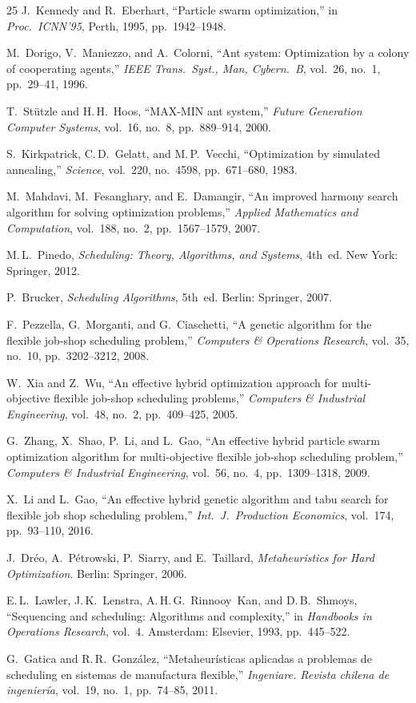 \documentclass[conference]{IEEEtran}
\begin{document}
\begin{thebibliography}{25}
J.~Kennedy and R.~Eberhart,
``Particle swarm optimization,''
in \textit{Proc.\ ICNN'95}, Perth, 1995, pp.~1942--1948.

M.~Dorigo, V.~Maniezzo, and A.~Colorni,
``Ant system: Optimization by a colony of cooperating agents,''
\textit{IEEE Trans.\ Syst., Man, Cybern.\ B}, vol.~26, no.~1,
pp.~29--41, 1996.

T.~St\"utzle and H.\,H.~Hoos,
``MAX-MIN ant system,''
\textit{Future Generation Computer Systems}, vol.~16, no.~8,
pp.~889--914, 2000.

S.~Kirkpatrick, C.\,D.~Gelatt, and M.\,P.~Vecchi,
``Optimization by simulated annealing,''
\textit{Science}, vol.~220, no.~4598, pp.~671--680, 1983.

M.~Mahdavi, M.~Fesanghary, and E.~Damangir,
``An improved harmony search algorithm for solving optimization
problems,''
\textit{Applied Mathematics and Computation}, vol.~188, no.~2,
pp.~1567--1579, 2007.

M.\,L.~Pinedo,
\textit{Scheduling: Theory, Algorithms, and Systems}, 4th~ed.
New York: Springer, 2012.

P.~Brucker,
\textit{Scheduling Algorithms}, 5th~ed.
Berlin: Springer, 2007.

F.~Pezzella, G.~Morganti, and G.~Ciaschetti,
``A genetic algorithm for the flexible job-shop scheduling problem,''
\textit{Computers \& Operations Research}, vol.~35, no.~10,
pp.~3202--3212, 2008.

W.~Xia and Z.~Wu,
``An effective hybrid optimization approach for multi-objective
flexible job-shop scheduling problems,''
\textit{Computers \& Industrial Engineering}, vol.~48, no.~2,
pp.~409--425, 2005.

G.~Zhang, X.~Shao, P.~Li, and L.~Gao,
``An effective hybrid particle swarm optimization algorithm for
multi-objective flexible job-shop scheduling problem,''
\textit{Computers \& Industrial Engineering}, vol.~56, no.~4,
pp.~1309--1318, 2009.

X.~Li and L.~Gao,
``An effective hybrid genetic algorithm and tabu search for flexible
job shop scheduling problem,''
\textit{Int.\ J.\ Production Economics}, vol.~174,
pp.~93--110, 2016.

J.~Dr\'eo, A.~P\'etrowski, P.~Siarry, and E.~Taillard,
\textit{Metaheuristics for Hard Optimization}.
Berlin: Springer, 2006.

E.\,L.~Lawler, J.\,K.~Lenstra, A.\,H.\,G.~Rinnooy~Kan, and
D.\,B.~Shmoys,
``Sequencing and scheduling: Algorithms and complexity,''
in \textit{Handbooks in Operations Research}, vol.~4.
Amsterdam: Elsevier, 1993, pp.~445--522.

G.~Gatica and R.\,R.~Gonz\'alez,
``Metaheur\'isticas aplicadas a problemas de scheduling en sistemas
de manufactura flexible,''
\textit{Ingeniare. Revista chilena de ingenier\'ia}, vol.~19,
no.~1, pp.~74--85, 2011.

\end{thebibliography}
\end{document}
